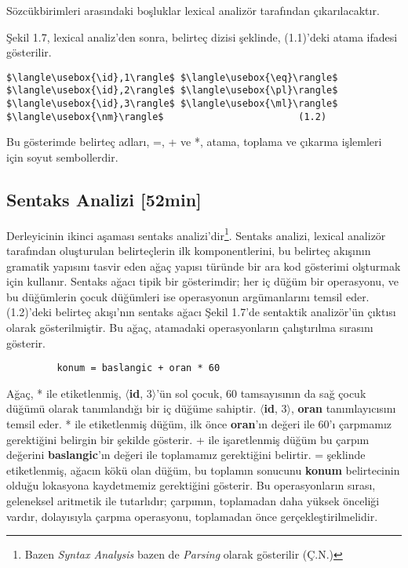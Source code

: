 \documentclass{book}
\begin{document}
Sözcükbirimleri arasındaki boşluklar lexical analizör tarafından çıkarılacaktır.

Şekil 1.7, lexical analiz'den sonra, belirteç dizisi şeklinde, (1.1)'deki atama ifadesi gösterilir.
\newsavebox\id
\newsavebox\eq
\newsavebox\pl
\newsavebox\ml
\newsavebox\nm
\savebox{}
\savebox\ml{\lstinline{*}}
\savebox\pl{\lstinline{+}}
\savebox\eq{\lstinline{=}}
\savebox{}



\begin{lstlisting}[mathescape]
 		 $\langle\usebox{\id},1\rangle$ $\langle\usebox{\eq}\rangle$ $\langle\usebox{\id},2\rangle$ $\langle\usebox{\pl}\rangle$ $\langle\usebox{\id},3\rangle$ $\langle\usebox{\ml}\rangle$ $\langle\usebox{\nm}\rangle$			             (1.2)
\end{lstlisting}

Bu gösterimde belirteç adları, =, + ve *, atama, toplama ve çıkarma işlemleri için soyut sembollerdir.


\subsection{Sentaks Analizi [52min]}
Derleyicinin ikinci aşaması sentaks analizi'dir\footnote{Bazen \textit{Syntax Analysis} bazen de \textit{Parsing} olarak gösterilir (Ç.N.)}. Sentaks analizi, lexical analizör tarafından oluşturulan belirteçlerin ilk komponentlerini, bu belirteç akışının gramatik yapısını tasvir eden ağaç yapısı türünde bir ara kod gösterimi olşturmak için kullanır. Sentaks ağacı tipik bir gösterimdir; her iç düğüm bir operasyonu, ve bu düğümlerin çocuk düğümleri ise operasyonun argümanlarını temsil eder. (1.2)'deki belirteç akışı'nın sentaks ağacı Şekil 1.7'de sentaktik analizör'ün çıktısı olarak gösterilmiştir.  Bu ağaç, atamadaki operasyonların çalıştırılma sırasını gösterir.
\begin{lstlisting}
 	     konum = baslangic + oran * 60        
\end{lstlisting}
Ağaç, * ile etiketlenmiş, $\langle$\textbf{id}, 3$\rangle$'ün sol çocuk, 60 tamsayısının da sağ çocuk düğümü olarak tanımlandığı bir iç düğüme sahiptir. $\langle$\textbf{id}, 3$\rangle$, \textbf{oran} tanımlayıcısını temsil eder. * ile etiketlenmiş düğüm, ilk önce \textbf{oran}'ın değeri ile 60'ı çarpmamız gerektiğini belirgin bir şekilde gösterir. + ile işaretlenmiş düğüm bu çarpım değerini \textbf{baslangic}'ın değeri ile toplamamız gerektiğini belirtir. = şeklinde etiketlenmiş, ağacın kökü olan düğüm, bu toplamın sonucunu \textbf{konum} belirtecinin olduğu lokasyona kaydetmemiz gerektiğini gösterir. Bu operasyonların sırası, geleneksel aritmetik ile tutarlıdır; çarpımın, toplamadan daha yüksek önceliği vardır, dolayısıyla çarpma operasyonu, toplamadan önce gerçekleştirilmelidir.
\end{document}
